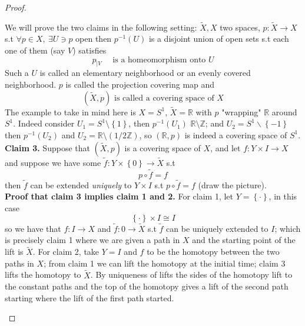 \documentclass[11pt,a4paper]{article}
\theoremstyle{definition}
\theoremstyle{plain}
\theoremstyle{remark}
\newcommand{\R}{\mathbb{R}}
\newcommand{\Z}{\mathbb{Z}}
\renewcommand{\set}[1]{\left\{ #1 \right\}}
\newcommand{\1}{\mathbbm{1}}
\begin{document}
\begin{proof}
\begin{itemize}
        We will prove the two claims in the following setting: $\tilde X, X$ two spaces, $p \colon \tilde X \to X$ s.t 
        $\forall p \in X, \ \exists U \ni p$ open then $p^{-1}(U)$ is a disjoint union of open sets s.t each one of them (say $V$) satisfies 
        $$p_{|V} \quad \text{ is a homeomorphism onto $U$}$$
        Such a $U$ is called an elementary neighborhood or an evenly covered neighborhood. $p$ is called the projection covering map and 
        $$(\tilde X, p) \text{ is called a covering space of } X$$
        The example to take in mind here is $X = S^1$, $\tilde X = \R$ with $p$ "wrapping" $\R$ around $S^1$. Indeed consider $U_1 = S^1 \setminus \set{1}$, then 
        $p^{-1} (U_1)$ $\R \setminus \Z$;  and $U_2 = S^1 \smallsetminus \set{-1}$ then $p^{-1} (U_2)$ and $U_2 = \R \setminus (1/2 \Z)$, so $(\R, p)$ is indeed a covering space 
        of $S^1$.\\
        \textbf{Claim 3.} Suppose that $(\tilde X, p)$ is a covering space of $X$, and let $f \colon Y \times I \to X$ and suppose we have some $\tilde f \colon Y \times \set{0} \to \tilde X$ 
        s.t 
        $$p \circ \tilde f = f$$
        then $\tilde f$ can be extended \emph{uniquely} to $Y \times I$ s.t $p \circ \tilde f = f$ (draw the picture).  \\
        \textbf{Proof that claim 3 implies claim 1 and 2.} For claim 1, let $Y = \set{\cdot}$, in this case 
        $$\set{\cdot} \times I \cong I$$
        so we have that $f \colon I \to X$ and $\tilde f \colon 0 \to \tilde X$ s.t $\tilde f$ can be uniquely extended to $I$; which is precisely claim 1
        where we are given a path in $X$ and the starting point of the lift is $\tilde X$. For claim 2, take $Y = I$ and $f$ to be the homotopy between 
        the two paths in $X$; from claim 1 we can lift the homotopy at the initial time; claim 3 lifts the homotopy to $\tilde X$. By uniqueness of lifts 
        the sides of the homotopy lift to the constant paths and the top of the homotopy gives a lift of the second path starting where the lift of the first path started.   


\end{itemize}
\end{proof}
\end{document}
